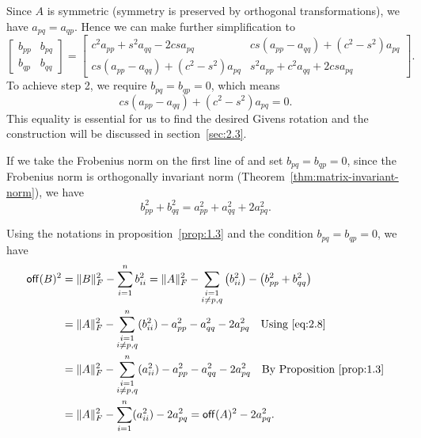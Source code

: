 Since $A$ is symmetric (symmetry is preserved by orthogonal transformations), we have $a_{pq} = a_{qp}$. Hence we can make further simplification to 
\begin{equation}
    \label{eq:2.3}
    \begin{bmatrix}
        b_{pp} & b_{pq} \\ b_{qp} & b_{qq}
    \end{bmatrix} =
    \begin{bmatrix}
        c^2 a_{pp} + s^2 a_{qq} -2csa_{pq} & cs(a_{pp} - a_{qq}) + (c^2 -s^2)a_{pq}\\
        cs(a_{pp}-a_{qq}) + (c^2 -s^2)a_{pq} & s^2 a_{pp} + c^2a_{qq} + 2csa_{pq}
    \end{bmatrix}.
\end{equation}
To achieve step 2, we require $b_{pq} = b_{qp} = 0$, which means
\begin{equation}\label{eq:2.4}
    cs(a_{pp}-a_{qq}) + (c^2 -s^2)a_{pq} = 0.
\end{equation}
This equality is essential for us to find the desired Givens rotation and the construction will be discussed in section~\ref{sec:2.3}.

If we take the Frobenius norm on the first line of  and set $b_{pq}=b_{qp} = 0$, since the Frobenius norm is orthogonally invariant norm (Theorem~\ref{thm:matrix-invariant-norm}), we have 
\begin{equation}\label{eq:2.8}
    b_{pp}^2 + b_{qq}^2 = a_{pp}^2 + a_{qq}^2 + 2a_{pq}^2.
\end{equation}

Using the notations in proposition~\ref{prop:1.3} and the condition $b_{pq} = b_{qp}=0$, we have 
\begin{equation}
    \label{eq:2.5}
    \begin{aligned}
        \off(B)^2 &= \|B\|_F^2 - \sum_{i=1}^n b^2_{ii} = \|A\|_F^2 - \sum_{\substack{i=1\\i\neq p,q}}\big(b^2_{ii}\big) - \big(b^2_{pp} + b^2_{qq}\big)\\
        & = \|A\|_F^2 - \sum^n_{\substack{i=1\\i\neq p,q}}(b^2_{ii}) - a_{pp}^2 - a_{qq}^2 - 2a_{pq}^2 \quad \text{Using \eref{eq:2.8}}\\
        & = \|A\|_F^2 - \sum^n_{\substack{i=1\\i\neq p,q}}(a^2_{ii}) - a_{pp}^2 - a_{qq}^2 - 2a_{pq}^2 \quad \text{By Proposition~\ref{prop:1.3}}\\
        & = \|A\|_F^2 - \sum_{i=1}^n(a^2_{ii}) - 2a_{pq}^2 = \off(A)^2 -2a_{pq}^2.
    \end{aligned}
\end{equation}

